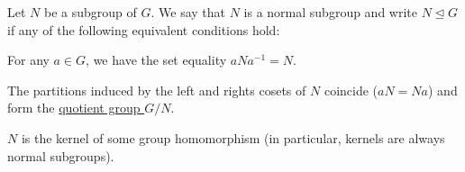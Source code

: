 \begin{definition}\label{def:normal_subgroup}
  Let $N$ be a subgroup of $G$. We say that $N$ is a normal subgroup and write $N \unlhd G$ if any of the following equivalent conditions hold:
  \begin{defenum}
    \item\label{def:normal_subgroup/direct} For any $a \in G$, we have the set equality $a N a^{-1} = N$.
    \item\label{def:normal_subgroup/cosets} The partitions induced by the left and rights cosets of $N$ coincide ($aN = Na$) and form the \ul{quotient group $G / N$}.
    \item\label{def:normal_subgroup/kernel} $N$ is the kernel of some group homomorphism (in particular, kernels are always normal subgroups).
  \end{defenum}
\end{definition}
